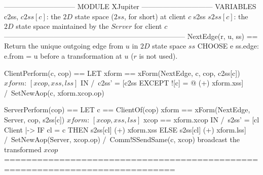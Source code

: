\documentclass{article}
\begin{document}
\begin{tla}
------------------------------ MODULE XJupiter ------------------------------
VARIABLES
    c2ss,   \* $c2ss[c]$: the $2D$ state space ($2ss$, for short) at client $c$
    s2ss    \* $s2ss[c]$: the $2D$ state space maintained by the $Server$ for client $c$
-----------------------------------------------------------------------------
NextEdge(r, u, ss) == \* Return the unique outgoing edge from $u$ in $2D$ state space $ss$ 
    CHOOSE e \in ss.edge: e.from = u \* before a transformation at $u$ ($r$ is not used). 

ClientPerform(c, cop) == 
    LET xform == xForm(NextEdge, c, cop, c2ss[c]) \* $xform$: $[xcop, xss, lss]$
    IN  /\ c2ss' = [c2ss EXCEPT ![c] = @ (+) xform.xss]
        /\ SetNewAop(c, xform.xcop.op)

ServerPerform(cop) == 
    LET c == ClientOf(cop)
    xform == xForm(NextEdge, Server, cop, s2ss[c]) \* $xform$: $[xcop, xss, lss]$
     xcop == xform.xcop
    IN  /\ s2ss' = [cl \in Client |-> IF cl = c 
                                      THEN s2ss[cl] (+) xform.xss 
                                      ELSE s2ss[cl] (+) xform.lss]
        /\ SetNewAop(Server, xcop.op)
        /\ Comm!SSendSame(c, xcop)  \* broadcast the transformed $xcop$ 
=============================================================================
\end{tla}
\end{document}
